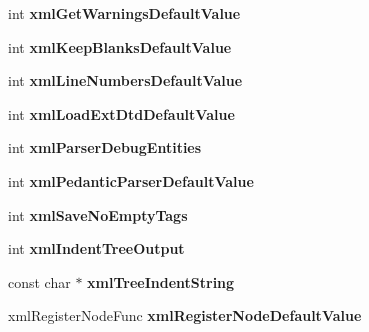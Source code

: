 \begin{DoxyCompactItemize}
\item 
\hypertarget{struct__xmlGlobalState_af4caac50e246cf1f1b6fc0fb9eb7ac83}{
int {\bfseries xmlGetWarningsDefaultValue}}
\label{struct__xmlGlobalState_af4caac50e246cf1f1b6fc0fb9eb7ac83}

\item 
\hypertarget{struct__xmlGlobalState_aafbd2893936cc7e0b906277bf4476f26}{
int {\bfseries xmlKeepBlanksDefaultValue}}
\label{struct__xmlGlobalState_aafbd2893936cc7e0b906277bf4476f26}

\item 
\hypertarget{struct__xmlGlobalState_a60edc1852ca27c7910919b2b0813f0f8}{
int {\bfseries xmlLineNumbersDefaultValue}}
\label{struct__xmlGlobalState_a60edc1852ca27c7910919b2b0813f0f8}

\item 
\hypertarget{struct__xmlGlobalState_a5372304342b0799d753b848b4ff797f2}{
int {\bfseries xmlLoadExtDtdDefaultValue}}
\label{struct__xmlGlobalState_a5372304342b0799d753b848b4ff797f2}

\item 
\hypertarget{struct__xmlGlobalState_ab1de5b17ba7c598ab79b3f842f017c26}{
int {\bfseries xmlParserDebugEntities}}
\label{struct__xmlGlobalState_ab1de5b17ba7c598ab79b3f842f017c26}

\item 
\hypertarget{struct__xmlGlobalState_aed754d7889fb431e0d9623660db32ea3}{
int {\bfseries xmlPedanticParserDefaultValue}}
\label{struct__xmlGlobalState_aed754d7889fb431e0d9623660db32ea3}

\item 
\hypertarget{struct__xmlGlobalState_a2e91a726bfc9552958e60c867ebb4a7b}{
int {\bfseries xmlSaveNoEmptyTags}}
\label{struct__xmlGlobalState_a2e91a726bfc9552958e60c867ebb4a7b}

\item 
\hypertarget{struct__xmlGlobalState_a321904b6d88296e892ebe7120aa62ace}{
int {\bfseries xmlIndentTreeOutput}}
\label{struct__xmlGlobalState_a321904b6d88296e892ebe7120aa62ace}

\item 
\hypertarget{struct__xmlGlobalState_aaa0df8b1a4d5a8fbcdde46d286e78625}{
const char $\ast$ {\bfseries xmlTreeIndentString}}
\label{struct__xmlGlobalState_aaa0df8b1a4d5a8fbcdde46d286e78625}

\item 
\hypertarget{struct__xmlGlobalState_a30d6034926e4292ce0feec490008c568}{
xmlRegisterNodeFunc {\bfseries xmlRegisterNodeDefaultValue}}
\label{struct__xmlGlobalState_a30d6034926e4292ce0feec490008c568}


\end{DoxyCompactItemize}
